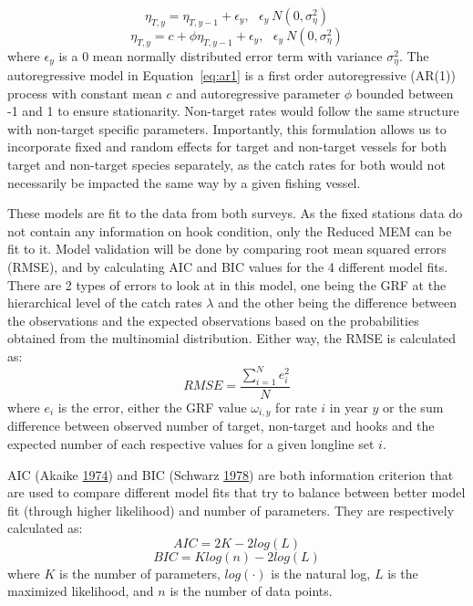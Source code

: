 \documentclass[12pt]{article}\usepackage[]{graphicx}\usepackage[]{color}
\begin{document}
\begin{equation}\label{eq:rand-walk}
\eta_{T,y} = \eta_{T,y-1} + \epsilon_y, \ \ \ \epsilon_y ~ N(0,\sigma_\eta^2)
\end{equation} \begin{equation}\label{eq:ar1}
\eta_{T,y} = c + \phi \eta_{T,y-1} + \epsilon_y, \ \ \ \epsilon_y ~ N(0,\sigma_\eta^2)
\end{equation}
where \(\epsilon_y\) is a 0 mean normally distributed error term with variance \(\sigma_\eta^2\). The autoregressive model in Equation~\ref{eq:ar1} is a first order autoregressive (AR(1)) process with constant mean \(c\) and autoregressive parameter \(\phi\) bounded between -1 and 1 to ensure stationarity. Non-target rates would follow the same structure with non-target specific parameters. Importantly, this formulation allows us to incorporate fixed and random effects for target and non-target vessels for both target and non-target species separately, as the catch rates for both would not necessarily be impacted the same way by a given fishing vessel.

These models are fit to the data from both surveys. As the fixed stations data do not contain any information on hook condition, only the Reduced MEM can be fit to it. Model validation will be done by comparing root mean squared errors (RMSE), and by calculating AIC and BIC values for the 4 different model fits. There are 2 types of errors to look at in this model, one being the GRF at the hierarchical level of the catch rates \(\lambda\) and the other being the difference between the observations and the expected observations based on the probabilities obtained from the multinomial distribution. Either way, the RMSE is calculated as:
\begin{equation}
RMSE = \frac{\sum_{i=1}^N e_i^2}{N}
\end{equation}
where \(e_i\) is the error, either the GRF value \(\omega_{i,y}\) for rate \(i\) in year \(y\) or the sum difference between observed number of target, non-target and hooks and the expected number of each respective values for a given longline set \(i\).

AIC (Akaike \protect\hyperlink{ref-Akaike1974}{1974}) and BIC (Schwarz \protect\hyperlink{ref-Schwarz1978}{1978}) are both information criterion that are used to compare different model fits that try to balance between better model fit (through higher likelihood) and number of parameters. They are respectively calculated as:
\begin{equation}\label{eq:aic}
AIC = 2K - 2 log(L)
\end{equation} \begin{equation}\label{eq:bic}
BIC = K log(n) - 2 log(L)
\end{equation}
where \(K\) is the number of parameters, \(log(\cdot)\) is the natural log, \(L\) is the maximized likelihood, and \(n\) is the number of data points.
\end{document}
